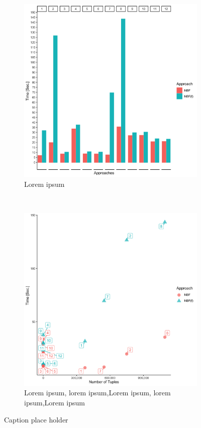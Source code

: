 \begin{figure}[t!]
    \centering
    \begin{subfigure}[t]{0.5\textwidth}
        \centering
        \includegraphics[scale=0.09]{figs/plots/emp-nbf-comp-f.png}
        \caption{Lorem ipsum}
    \end{subfigure}%
    ~ 
    \begin{subfigure}[t]{0.5\textwidth}
        \centering
        \includegraphics[scale=0.09]{figs/plots/emp-nbf-f-comp-scatter.png}
        \caption{Lorem ipsum, lorem ipsum,Lorem ipsum, lorem ipsum,Lorem ipsum}
    \end{subfigure}
    \caption{Caption place holder}
\end{figure}